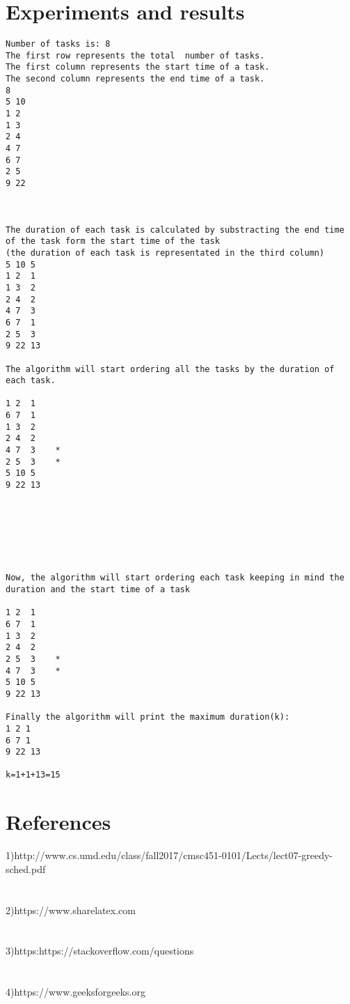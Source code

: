 \documentclass[14pt]{article}
\begin{document}
\section*{Experiments and results}
\begin{lstlisting}
Number of tasks is: 8
The first row represents the total  number of tasks.
The first column represents the start time of a task.
The second column represents the end time of a task.
8
5 10
1 2
1 3
2 4
4 7
6 7
2 5
9 22



The duration of each task is calculated by substracting the end time of the task form the start time of the task
(the duration of each task is representated in the third column)
5 10 5
1 2  1
1 3  2
2 4  2
4 7  3
6 7  1
2 5  3
9 22 13 

The algorithm will start ordering all the tasks by the duration of each task.

1 2  1
6 7  1
1 3  2
2 4  2
4 7  3    *
2 5  3    *
5 10 5
9 22 13 







Now, the algorithm will start ordering each task keeping in mind the duration and the start time of a task

1 2  1
6 7  1
1 3  2
2 4  2
2 5  3    *
4 7  3    *
5 10 5
9 22 13 

Finally the algorithm will print the maximum duration(k):
1 2 1
6 7 1
9 22 13

k=1+1+13=15
\end{lstlisting}


\newpage
\section*{References}
\vspace{20 mm}
\large 1)http://www.cs.umd.edu/class/fall2017/cmsc451-0101/Lects/lect07-greedy-sched.pdf
\\
\\\vspace{6mm}
\\
2)https://www.sharelatex.com
\\
\\\vspace{6mm}
\\
3)https:https://stackoverflow.com/questions
\\
\\\vspace{6mm}
\\
4)https://www.geeksforgeeks.org
\\
\\
\end{document}
